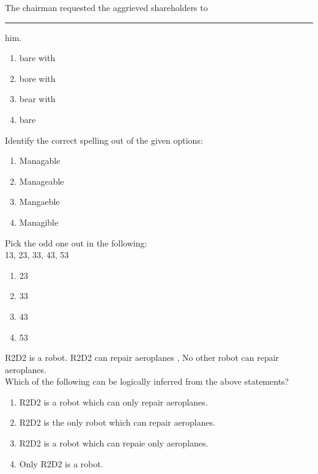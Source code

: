 \item The chairman requested the aggrieved shareholders to \rule{1cm}{0.15mm} him.
\begin{multicols}{2}
    \begin{enumerate}
        \item bare with
        \item bore with
        \item bear with
        \item bare
    \end{enumerate}
\end{multicols}

\item Identify the correct spelling out of the given options:
\begin{multicols}{1}
    \begin{enumerate}
        \item Managable
        \item Manageable
        \item Mangaeble
        \item Managible
    \end{enumerate}
\end{multicols}

\item Pick the odd one out in the following:\\
13, 23, 33, 43, 53
\begin{multicols}{1}
    \begin{enumerate}
        \item 23
        \item 33
        \item 43
        \item 53
    \end{enumerate}
\end{multicols}

\item R2D2 is a robot. R2D2 can repair aeroplanes , No other robot can repair aeroplanes.\\
Which of the following can be logically inferred from the above statements?
\begin{multicols}{2}
    \begin{enumerate}
        \item R2D2 is a robot which can only repair aeroplanes.
        \item R2D2 is the only robot which can repair aeroplanes.
        \item R2D2 is a robot which can repaie only aeroplanes.
        \item Only R2D2 is a robot.
    \end{enumerate}
\end{multicols}


